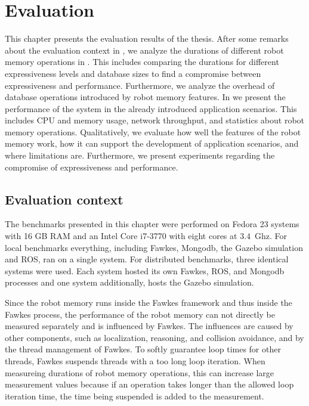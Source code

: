\chapter{Evaluation}
\label{sec:evaluation}
This chapter presents the evaluation results of the thesis. After some
remarks about the evaluation context in , we
analyze the durations of different robot memory operations in
. This includes comparing the durations for
different expressiveness levels and database sizes to find a
compromise between expressiveness and performance. Furthermore, we
analyze the overhead of database operations introduced by robot memory
features. In  we present the performance of
the system in the already introduced application scenarios. This
includes CPU and memory usage, network throughput, and statistics
about robot memory operations. Qualitatively, we evaluate how well the
features of the robot memory work, how it can support the development
of application scenarios, and where limitations are. Furthermore, we
present experiments regarding the compromise of expressiveness and
performance. 

\section{Evaluation context}
\label{sec:eval-context}
The benchmarks presented in this chapter were performed on Fedora 23
systems with 16 GB RAM and an Intel Core i7-3770 with eight cores at
$3.4$~Ghz. For local benchmarks everything, including Fawkes, Mongodb,
the Gazebo simulation and ROS, ran on a single system. For distributed
benchmarks, three identical systems were used. Each system hosted its
own Fawkes, ROS, and Mongodb processes and one system additionally,
hosts the Gazebo simulation.

Since the robot memory runs inside the Fawkes framework and thus
inside the Fawkes process, the performance of the robot memory can not
directly be measured separately and is influenced by Fawkes. The
influences are caused by other components, such as localization,
reasoning, and collision avoidance, and by the thread management of
Fawkes. To softly guarantee loop times for other threads, Fawkes
suspends threads with a too long loop iteration. When measureing
durations of robot memory operations, this can increase large
measurement values because if an operation takes longer than the
allowed loop iteration time, the time being suspended is added to the
measurement.

